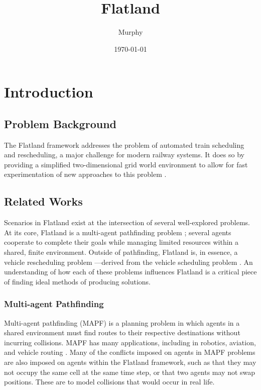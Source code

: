 \documentclass[11pt]{article}
\title{Flatland}
\author{Murphy}
\date{\today}
\begin{document}
\maketitle	
\pagebreak

\tableofcontents
\pagebreak


\section{Introduction}
\subsection{Problem Background}
The Flatland framework addresses the problem of automated train scheduling and rescheduling, a major challenge
for modern railway systems. It does so by providing a simplified two-dimensional grid world environment to allow for fast experimentation of new approaches to this problem \citep{monylascscbhwaegeibavistsasp20a}. 

\subsection{Related Works}
Scenarios in Flatland exist at the intersection of several well-explored problems.  At its core, Flatland is a multi-agent pathfinding problem \citep{silver05a}; several agents cooperate to complete their goals while managing limited resources within a shared, finite environment.  Outside of pathfinding, Flatland is, in essence, a vehicle rescheduling problem \citep{limibo07a}—derived from the vehicle scheduling problem \citep{bapeukfa00a}.  An understanding of how each of these problems influences Flatland is a critical piece of finding ideal methods of producing solutions.

\subsubsection{Multi-agent Pathfinding}
Multi-agent pathfinding (MAPF) \citep{silver05a} is a planning problem in which agents in a shared environment must find routes to their respective destinations without incurring collisions.  MAPF has many applications, including in robotics, aviation, and vehicle routing \citep{standley10a}.  Many of the conflicts imposed on agents in MAPF problems are also imposed on agents within the Flatland framework, such as that they may not occupy the same cell at the same time step, or that two agents may not swap positions.  These are to model collisions that would occur in real life.  
\end{document}
